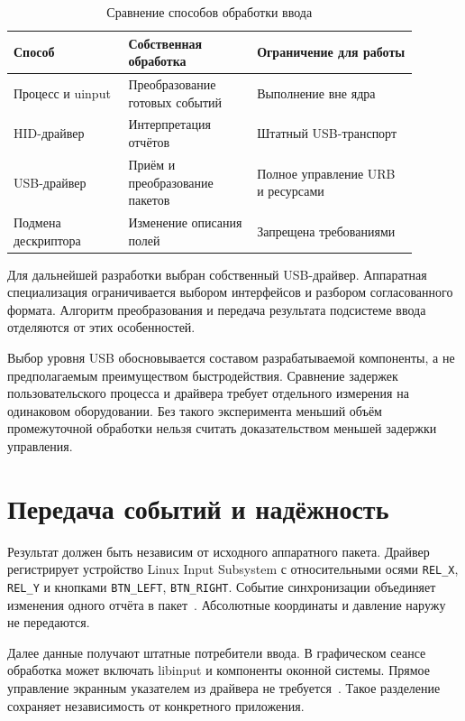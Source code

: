 \begin{table}[htbp]
    \caption{Сравнение способов обработки ввода}
    \label{tbl:approaches}
    \centering
    \small
    \begin{tabular}{|p{0.25\linewidth}|p{0.29\linewidth}|p{0.35\linewidth}|}
        \hline
        Способ & Собственная обработка & Ограничение для работы \\ \hline
        Процесс и uinput & Преобразование готовых событий & Выполнение вне ядра \\ \hline
        HID-драйвер & Интерпретация отчётов & Штатный USB-транспорт \\ \hline
        USB-драйвер & Приём и преобразование пакетов & Полное управление URB и ресурсами \\ \hline
        Подмена дескриптора & Изменение описания полей & Запрещена требованиями \\ \hline
    \end{tabular}
\end{table}

Для дальнейшей разработки выбран собственный USB-драйвер. Аппаратная специализация ограничивается выбором интерфейсов и разбором согласованного формата. Алгоритм преобразования и передача результата подсистеме ввода отделяются от этих особенностей.

Выбор уровня USB обосновывается составом разрабатываемой компоненты, а не предполагаемым преимуществом быстродействия. Сравнение задержек пользовательского процесса и драйвера требует отдельного измерения на одинаковом оборудовании. Без такого эксперимента меньший объём промежуточной обработки нельзя считать доказательством меньшей задержки управления.

\section{Передача событий и надёжность}

Результат должен быть независим от исходного аппаратного пакета. Драйвер регистрирует устройство Linux Input Subsystem с относительными осями \texttt{REL\_X}, \texttt{REL\_Y} и кнопками \texttt{BTN\_LEFT}, \texttt{BTN\_RIGHT}. Событие синхронизации объединяет изменения одного отчёта в пакет~\cite{kernelinput}. Абсолютные координаты и давление наружу не передаются.

Далее данные получают штатные потребители ввода. В графическом сеансе обработка может включать libinput и компоненты оконной системы. Прямое управление экранным указателем из драйвера не требуется~\cite{libinput}. Такое разделение сохраняет независимость от конкретного приложения.

